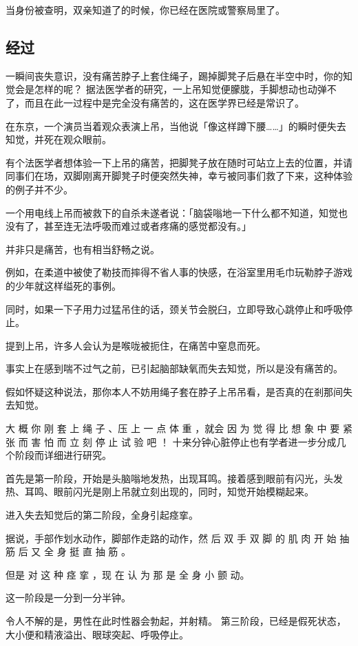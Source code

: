 \documentclass[UTF8]{ctexart}
\begin{document}
当身份被查明，双亲知道了的时候，你已经在医院或警察局里了。

\subsection{经过}

一瞬间丧失意识，没有痛苦脖子上套住绳子，踢掉脚凳子后悬在半空中时，你的知觉会是怎样的呢？
据法医学者的研究，一上吊知觉便朦胧，手脚想动也动弹不了，而且在此一过程中是完全没有痛苦的，这在医学界已经是常识了。

在东京，一个演员当着观众表演上吊，当他说「像这样蹲下腰……」的瞬时便失去知觉，并死在观众眼前。

有个法医学者想体验一下上吊的痛苦，把脚凳子放在随时可站立上去的位置，并请同事们在场，双脚刚离开脚凳子时便突然失神，幸亏被同事们救了下来，这种体验的例子并不少。

一个用电线上吊而被救下的自杀未遂者说：「脑袋嗡地一下什么都不知道，知觉也没有了，甚至连无法呼吸而难过或者疼痛的感觉都没有。」

并非只是痛苦，也有相当舒畅之说。

例如，在柔道中被使了勒技而摔得不省人事的快感，在浴室里用毛巾玩勒脖子游戏的少年就这样缢死的事例。

同时，如果一下子用力过猛吊住的话，颈关节会脱臼，立即导致心跳停止和呼吸停止。

提到上吊，许多人会认为是喉咙被扼住，在痛苦中窒息而死。

事实上在感到喘不过气之前，已引起脑部缺氧而失去知觉，所以是没有痛苦的。

假如怀疑这种说法，那你本人不妨用绳子套在脖子上吊吊看，是否真的在剎那间失去知觉。

大 概 你 刚 套 上 绳 子 、压 上 一 点 体 重 ，就会 因 为 觉 得 比 想 象 中 要 紧 张 而 害 怕 而 立 刻 停 止 试 验 吧 ！ 十来分钟心脏停止也有学者进一步分成几个阶段而详细进行研究。

首先是第一阶段，开始是头脑嗡地发热，出现耳鸣。接着感到眼前有闪光，头发热、耳鸣、眼前闪光是刚上吊就立刻出现的，同时，知觉开始模糊起来。

进入失去知觉后的第二阶段，全身引起痉挛。

据说，手部作划水动作，脚部作走路的动作，然 后 双 手 双 脚 的 肌 肉 开 始 抽 筋 后 又 全 身 挺 直 抽 筋 。

但是 对 这 种 痉 挛 ，现 在 认 为 那 是 全 身 小 颤 动。

这一阶段是一分到一分半钟。

令人不解的是，男性在此时性器会勃起，并射精。 第三阶段，已经是假死状态，大小便和精液溢出、眼球突起、呼吸停止。
\end{document}
